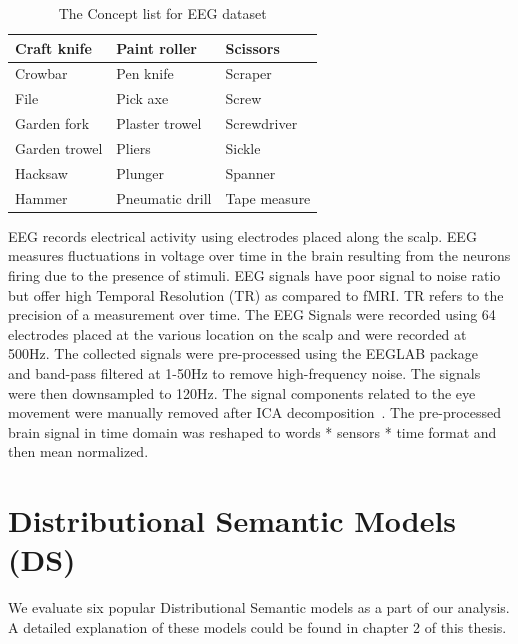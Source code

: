 \begin{table}[t]
\begin{tabular}{lll}
\multicolumn{1}{|l|}{Craft knife}   & \multicolumn{1}{l|}{Paint roller}   & \multicolumn{1}{l|}{Scissors}    \\ \hline
\multicolumn{1}{|l|}{Crowbar}       & \multicolumn{1}{l|}{Pen knife}      & \multicolumn{1}{l|}{Scraper}     \\ \hline
\multicolumn{1}{|l|}{File}          & \multicolumn{1}{l|}{Pick axe}       & \multicolumn{1}{l|}{Screw}       \\ \hline
\multicolumn{1}{|l|}{Garden fork}   & \multicolumn{1}{l|}{Plaster trowel} & \multicolumn{1}{l|}{Screwdriver} \\ \hline
\multicolumn{1}{|l|}{Garden trowel} & \multicolumn{1}{l|}{Pliers}         & \multicolumn{1}{l|}{Sickle}      \\ \hline
\multicolumn{1}{|l|}{Hacksaw}       & \multicolumn{1}{l|}{Plunger}        & \multicolumn{1}{l|}{Spanner}     \\ \hline
\multicolumn{1}{|l|}{Hammer}       &\multicolumn{1}{l|}{Pneumatic drill }                     & \multicolumn{1}{|l|}{Tape measure}                     \\ \hline
\end{tabular}
\caption{The Concept list for EEG dataset}
\label{EEGConcepts}
\end{table}
EEG records electrical activity using electrodes placed along the scalp. EEG measures fluctuations in voltage over time in the brain resulting from the neurons firing due to the presence of stimuli. EEG signals have poor signal to noise ratio but offer high Temporal Resolution (TR) as compared to fMRI. TR refers to the precision of a measurement over time. The EEG Signals were recorded using 64 electrodes placed at the various location on the scalp and were recorded at 500Hz. The collected signals were pre-processed using the EEGLAB package~\cite{EEGLAB} and band-pass filtered at 1-50Hz to remove high-frequency noise. The signals were then downsampled to 120Hz. The signal components related to the eye movement were manually removed after ICA decomposition~\cite{ICA}. The pre-processed brain signal in time domain was reshaped to words * sensors * time format and then mean normalized.



\section{Distributional Semantic Models (DS)}
We evaluate six popular Distributional Semantic models as a part of our analysis. A detailed explanation of these models could be found in chapter 2 of this thesis.

